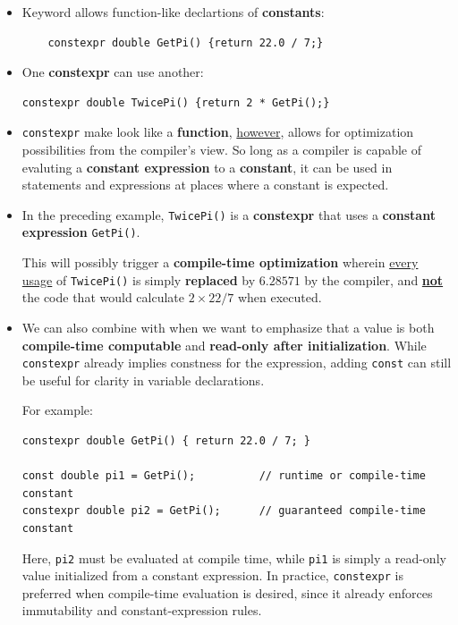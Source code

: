 \documentclass[10pt]{article}
\newcommand{\vocab}[1]{\fbox{\textbf{\textit{#1}}}}
\begin{document}
\begin{itemize}
	\item Keyword \vocab{constexpr} allows function-like declartions of \textbf{constants}:
	\begin{verbatim}
	constexpr double GetPi() {return 22.0 / 7;}
	\end{verbatim}

\item One \textbf{constexpr} can use another:
	\begin{verbatim}
constexpr double TwicePi() {return 2 * GetPi();}
	\end{verbatim}

\item \verb|constexpr| make look like a \textbf{function}, \underline{however}, allows for optimization possibilities from the compiler's view. So long as a compiler is capable of evaluting a \textbf{constant expression} to a \textbf{constant}, it can be used in statements and expressions at places where a constant is expected.\\

\item In the preceding example, \verb|TwicePi()| is a \textbf{constexpr} that uses a \textbf{constant expression} \verb|GetPi()|.

	This will possibly trigger a \textbf{compile-time optimization} wherein \underline{every usage} of \verb|TwicePi()| is simply \textbf{replaced} by $6.28571$ by the compiler, and \textbf{\underline{not}} the code that would calculate $2 \times 22 / 7$ when executed.\\

\item We can also combine \vocab{constexpr} with \vocab{const} when we want to emphasize that a value is both \textbf{compile-time computable} and \textbf{read-only after initialization}. While \verb|constexpr| already implies constness for the expression, adding \verb|const| can still be useful for clarity in variable declarations.

For example:

\begin{verbatim}
constexpr double GetPi() { return 22.0 / 7; }

const double pi1 = GetPi();          // runtime or compile-time constant
constexpr double pi2 = GetPi();      // guaranteed compile-time constant
\end{verbatim}

Here, \verb|pi2| must be evaluated at compile time, while \verb|pi1| is simply a read-only value initialized from a constant expression. In practice, \verb|constexpr| is preferred when compile-time evaluation is desired, since it already enforces immutability and constant-expression rules.\\ 


\end{itemize}
\end{document}
